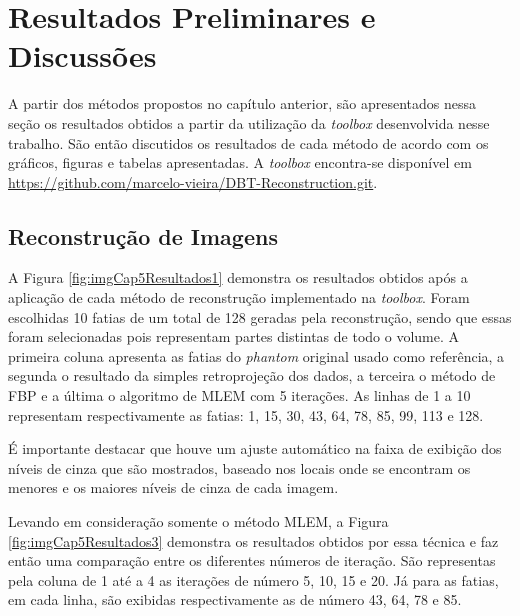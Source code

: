 \chapter[Resultados Preliminares e Discussão]{Resultados Preliminares  e Discussões}\label{Capitulo5}

A partir dos métodos propostos no capítulo anterior, são apresentados nessa seção os resultados obtidos a partir da utilização da \textit{toolbox} desenvolvida nesse trabalho. São então discutidos os resultados de cada método de acordo com os gráficos, figuras e tabelas apresentadas. A \textit{toolbox} encontra-se disponível em \url{https://github.com/marcelo-vieira/DBT-Reconstruction.git}. 

\section{Reconstrução de Imagens}

A Figura \ref{fig:imgCap5Resultados1} demonstra os resultados obtidos após a aplicação de cada método de reconstrução implementado na \textit{toolbox}. Foram escolhidas 10 fatias de um total de 128 geradas pela reconstrução, sendo que essas foram selecionadas pois representam partes distintas de todo o volume. A primeira coluna apresenta as fatias do \textit{phantom} original usado como referência, a segunda o resultado da simples retroprojeção dos dados, a terceira o método de \acs{FBP} e a última o algoritmo de \acs{MLEM} com 5 iterações. As linhas de 1 a 10 representam respectivamente as fatias: 1, 15, 30, 43, 64, 78, 85, 99, 113 e 128. 

É importante destacar que houve um ajuste automático na faixa de exibição dos níveis de cinza que são mostrados, baseado nos locais onde se encontram os menores e os maiores níveis de cinza de cada imagem. 


Levando em consideração somente o método \acs{MLEM}, a Figura \ref{fig:imgCap5Resultados3} demonstra os resultados obtidos por essa técnica e faz então uma comparação entre os diferentes números de iteração. São representas pela coluna de 1 até a 4 as iterações de número 5, 10, 15 e 20. Já para as fatias, em cada linha, são exibidas respectivamente as de número 43, 64, 78 e 85.  

